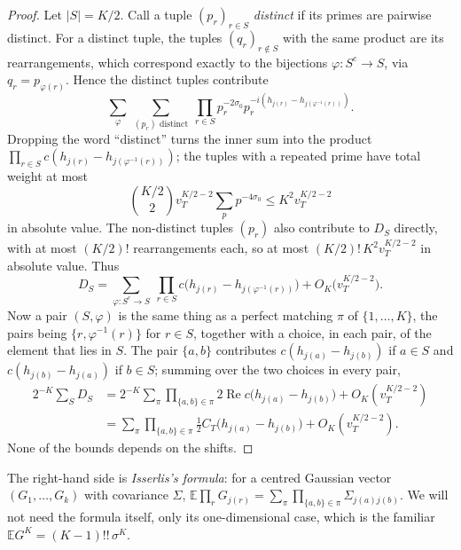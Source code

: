 \begin{proof}
Let $|S|=K/2$. Call a tuple $(p_r)_{r\in S}$ \emph{distinct} if its primes are pairwise distinct. For a distinct tuple, the tuples $(q_r)_{r\notin S}$ with the same product are its rearrangements, which correspond exactly to the bijections $\varphi:S^c\to S$, via $q_r=p_{\varphi(r)}$. Hence the distinct tuples contribute
\[
\sum_{\varphi}\ \sum_{(p_r)\text{ distinct}}\ \prod_{r\in S}p_r^{-2\sigma_0}p_r^{-i(h_{j(r)}-h_{j(\varphi^{-1}(r))})}.
\]
Dropping the word ``distinct'' turns the inner sum into the product $\prod_{r\in S}c(h_{j(r)}-h_{j(\varphi^{-1}(r))})$; the tuples with a repeated prime have total weight at most
\[
\binom{K/2}2v_T^{K/2-2}\sum_pp^{-4\sigma_0}\le K^2v_T^{K/2-2}
\]
in absolute value. The non-distinct tuples $(p_r)$ also contribute to $D_S$ directly, with at most $(K/2)!$ rearrangements each, so at most $(K/2)!\,K^2v_T^{K/2-2}$ in absolute value. Thus
\[
D_S=\sum_{\varphi:S^c\to S}\ \prod_{r\in S}c\bigl(h_{j(r)}-h_{j(\varphi^{-1}(r))}\bigr)+O_K\bigl(v_T^{K/2-2}\bigr).
\]
Now a pair $(S,\varphi)$ is the same thing as a perfect matching $\pi$ of $\{1,\dots,K\}$, the pairs being $\{r,\varphi^{-1}(r)\}$ for $r\in S$, together with a choice, in each pair, of the element that lies in $S$. The pair $\{a,b\}$ contributes $c(h_{j(a)}-h_{j(b)})$ if $a\in S$ and $c(h_{j(b)}-h_{j(a)})$ if $b\in S$; summing over the two choices in every pair,
\[
\begin{aligned}
2^{-K}\sum_SD_S&=2^{-K}\sum_\pi\prod_{\{a,b\}\in\pi}2\operatorname{Re}c\bigl(h_{j(a)}-h_{j(b)}\bigr)+O_K(v_T^{K/2-2})\\
&=\sum_\pi\prod_{\{a,b\}\in\pi}\tfrac12C_T\bigl(h_{j(a)}-h_{j(b)}\bigr)+O_K(v_T^{K/2-2}).
\end{aligned}
\]
None of the bounds depends on the shifts.
\end{proof}

The right-hand side is \emph{Isserlis's formula}: for a centred Gaussian vector $(G_1,\dots,G_k)$ with covariance $\Sigma$, $\mathbb E\prod_rG_{j(r)}=\sum_\pi\prod_{\{a,b\}\in\pi}\Sigma_{j(a)j(b)}$. We will not need the formula itself, only its one-dimensional case, which is the familiar $\mathbb EG^K=(K-1)!!\,\sigma^K$.


